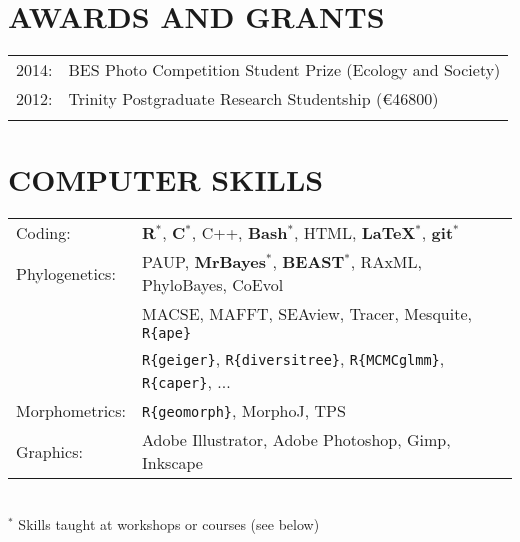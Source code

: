 \documentclass[10pt,a4paper]{article}
\begin{document}
{%


\section{AWARDS AND GRANTS}
\begin{tabular}{ll}
2014: & BES Photo Competition Student Prize (Ecology and Society)\\
2012: & Trinity Postgraduate Research Studentship (\euro46800)\\
& \\ 
\end{tabular}
\bigskip

\section{COMPUTER SKILLS}
\begin{tabular}{ll}
Coding: & \textbf{{R}$^{*}$}, \textbf{C$^{*}$}, C++, \textbf{Bash$^{*}$}, HTML, \textbf{\LaTeX$^{*}$}, \textbf{git$^{*}$}\\[1.5ex]
Phylogenetics: & PAUP, \textbf{MrBayes$^{*}$}, \textbf{BEAST$^{*}$}, RAxML, PhyloBayes, CoEvol \\
& MACSE, MAFFT, SEAview, Tracer, Mesquite, \texttt{R\{ape\}} \\
& \texttt{R\{geiger\}}, \texttt{R\{diversitree\}}, \texttt{R\{MCMCglmm\}}, \texttt{R\{caper\}}, ... \\[1.5ex]
Morphometrics: & \texttt{R\{geomorph\}}, MorphoJ, TPS \\[1.5ex]
Graphics: & Adobe Illustrator, Adobe Photoshop, Gimp, Inkscape\\[1.5ex]
\end{tabular} \\
$^{*}$ Skills taught at workshops or courses (see below)
\bigskip

}
\end{document}
